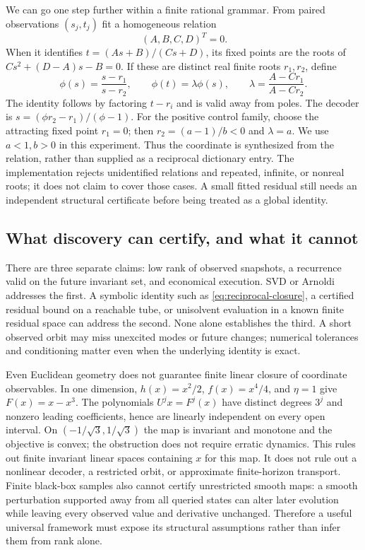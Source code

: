 We can go one step further within a finite rational grammar. From paired
observations $(s_j,t_j)$ fit a homogeneous relation
\begin{equation}
 [s_j,1,-s_jt_j,-t_j]\,(A,B,C,D)^T=0.
\end{equation}
When it identifies $t=(As+B)/(Cs+D)$, its fixed points are the roots of
$Cs^2+(D-A)s-B=0$. If these are distinct real finite roots $r_1,r_2$, define
\begin{equation}
 \phi(s)=\frac{s-r_1}{s-r_2},\qquad
 \phi(t)=\lambda\phi(s),\qquad
 \lambda=\frac{A-Cr_1}{A-Cr_2}.
 \label{eq:synthesized-crossratio}
\end{equation}
The identity follows by factoring $t-r_i$ and is valid away from poles.
The decoder is $s=(\phi r_2-r_1)/(\phi-1)$.
For the positive control family, choose the attracting fixed point $r_1=0$;
then $r_2=(a-1)/b<0$ and $\lambda=a$. We use $a<1,b>0$ in this experiment.
Thus the coordinate is synthesized from the relation, rather than supplied
as a reciprocal dictionary entry. The implementation rejects unidentified
relations and repeated, infinite, or nonreal roots; it does not claim to cover
those cases. A small fitted residual still needs an independent structural
certificate before being treated as a global identity.

\subsection{What discovery can certify, and what it cannot}
There are three separate claims: low rank of observed snapshots, a recurrence
valid on the future invariant set, and economical execution. SVD or Arnoldi
addresses the first. A symbolic identity such as
\eqref{eq:reciprocal-closure}, a certified residual bound on a reachable tube,
or unisolvent evaluation in a known finite residual space can address the
second. None alone establishes the third. A short observed orbit may miss
unexcited modes or future changes; numerical tolerances and conditioning
matter even when the underlying identity is exact.

Even Euclidean geometry does not guarantee finite linear closure of coordinate
observables. In one dimension, $h(x)=x^2/2$, $f(x)=x^4/4$, and $\eta=1$ give
$F(x)=x-x^3$. The polynomials $U^jx=F^j(x)$ have distinct degrees $3^j$ and
nonzero leading coefficients, hence are linearly independent on every open
interval. On $(-1/\sqrt3,1/\sqrt3)$ the map is invariant and monotone and the
objective is convex; the obstruction does not require erratic dynamics.
This rules out finite invariant linear spaces containing $x$ for this map.
It does not rule out a nonlinear decoder, a restricted orbit, or approximate
finite-horizon transport. Finite black-box samples also cannot certify
unrestricted smooth maps: a smooth perturbation supported away from all
queried states can alter later evolution while leaving every observed value
and derivative unchanged. Therefore a useful universal framework must expose
its structural assumptions rather than infer them from rank alone.

